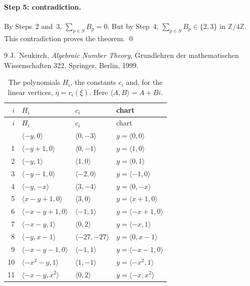\documentclass[11pt]{article}
\newcommand{\Z}{\mathbb{Z}}
\begin{document}
\paragraph{Step 5: contradiction.} By Steps~2 and~3, $\sum_{p\in S}B_p=0$. But by Step~4, $\sum_{p\in S}B_p\in\{2,3\}$ in $\Z/4\Z$. This contradiction proves the theorem.
\qed


\begin{thebibliography}{9}
 J.~Neukirch, \emph{Algebraic Number Theory}, Grundlehren der mathematischen Wissenschaften 322, Springer, Berlin, 1999.
\end{thebibliography}

\clearpage
\begingroup\small
\setlength{\LTcapwidth}{\textwidth}
\begin{longtable}{@{}rlll@{}}
\caption{The polynomials $H_i$, the constants $c_i$ and, for the linear vertices, $\eta=r_i(\xi)$. Here $\langle A,B\rangle=A+Bi$.}\label{tab:vert1}\\
\hline $i$ & $H_i$ & $c_i$ & chart\\\hline\endfirsthead\hline $i$ & $H_i$ & $c_i$ & chart\\\hline\endhead\hline\endfoot
0 & $\langle -y,0\rangle$ & $\langle 0,-3\rangle$ & $y=\langle 0,0\rangle$\\
1 & $\langle -y+1,0\rangle$ & $\langle 0,-1\rangle$ & $y=\langle 1,0\rangle$\\
2 & $\langle -y,1\rangle$ & $\langle 1,0\rangle$ & $y=\langle 0,1\rangle$\\
3 & $\langle -y-1,0\rangle$ & $\langle -2,0\rangle$ & $y=\langle -1,0\rangle$\\
4 & $\langle -y,-x\rangle$ & $\langle 3,-4\rangle$ & $y=\langle 0,-x\rangle$\\
5 & $\langle x-y+1,0\rangle$ & $\langle 3,0\rangle$ & $y=\langle x+1,0\rangle$\\
6 & $\langle -x-y+1,0\rangle$ & $\langle -1,1\rangle$ & $y=\langle -x+1,0\rangle$\\
7 & $\langle -x-y,1\rangle$ & $\langle 0,2\rangle$ & $y=\langle -x,1\rangle$\\
8 & $\langle -y,x-1\rangle$ & $\langle -27,-27\rangle$ & $y=\langle 0,x-1\rangle$\\
9 & $\langle -x-y-1,0\rangle$ & $\langle -1,1\rangle$ & $y=\langle -x-1,0\rangle$\\
10 & $\langle -x^{2}-y,1\rangle$ & $\langle 1,-1\rangle$ & $y=\langle -x^{2},1\rangle$\\
11 & $\langle -x-y,x^{2}\rangle$ & $\langle 0,2\rangle$ & $y=\langle -x,x^{2}\rangle$\\

\end{longtable}
\end{document}
